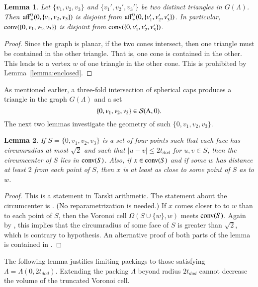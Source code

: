 \documentclass{article} %
\newtheorem{lemma}{Lemma}[subsection]
\begin{document}
\begin{lemma}  Let $\{v_1,v_2,v_3\}$ and $\{v_1',v_2',v_3'\}$
be two distinct triangles in $G(\Lambda)$.  Then
${\operatorname{aff}}_+^0(0,\{v_1,v_2,v_3\})$ is disjoint from
${\operatorname{aff}}_+^0(0,\{v_1',v_2',v_3'\})$.  In particular,
${\operatorname{conv}}(\{0,v_1,v_2,v_3\})$ is disjoint from
${\operatorname{conv}}(\{0,v_1',v_2',v_3'\})$.
\end{lemma}

\begin{proof} Since the graph is planar, if the two cones
intersect, then one triangle must be contained in the other
triangle.  That is, one cone is contained in the other.  This
leads to a vertex $w$ of one triangle in the other
cone.  This is prohibited
by Lemma~\ref{lemma:enclosed}.
\end{proof}

As mentioned earlier, a three-fold intersection of spherical
caps produces a triangle in the graph $G(\Lambda)$ and a 
set 
$$\{0,v_1,v_2,v_3\}\in {\mathcal S}(\Lambda,0).$$
The next two lemmas investigate the geometry of such $\{0,v_1,v_2,v_3\}$.

\begin{lemma}\label{lemma:Q}
If $S=\{0,v_1,v_2,v_3\}$ is a set of four points such that each
face has circumradius at most $\sqrt2$ and such that
$|u-v|\le 2t_{dod}$ for $u,v\in S$, then
the circumcenter of $S$ lies in ${\operatorname{conv}}(S)$.  Also, if $x
\in {\operatorname{conv}}(S)$ and if some $w$ has distance at least $2$ from each
point of $S$, then $x$ is at least as close to some point of $S$ as to
$w$.
\end{lemma}

\begin{proof} This is a statement in Tarski arithmetic.
The statement about the circumcenter is \cite[Lemma~5.18]{Hales:2006:DCG}.
(No reparametrization is needed.)
If $x$  comes closer to  to $w$  than to each point of $S$, then
the Voronoi cell $\Omega(S\cup\{w\},w)$ meets ${\operatorname{conv}}(S)$.
Again by \cite[Lemma~5.18]{Hales:2006:DCG}, this implies that the circumradius
of some face of $S$ is greater than $\sqrt2$, which is contrary
to hypothesis. An alternative proof 
of both parts of the lemma
is contained in \cite[Lemma~3.5,3.6]{Hales:2002:Dodec}.
\end{proof}

The following lemma justifies limiting packings to those
satisfying $\Lambda=\Lambda(0,2t_{dod})$.  Extending the packing
$\Lambda$ beyond radius $2t_{dod}$ cannot decrease the volume of the
truncated Voronoi cell.
\end{document}
